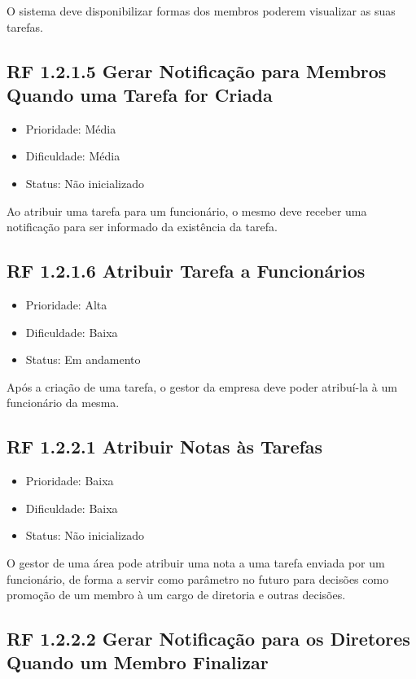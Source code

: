 O sistema deve disponibilizar formas dos membros poderem visualizar as suas tarefas.


\subsection{RF 1.2.1.5 Gerar Notificação para Membros Quando uma Tarefa for Criada}

\begin{itemize}
  \item{Prioridade: Média}
  \item{Dificuldade: Média}
  \item{Status: Não inicializado}
\end{itemize}

Ao atribuir uma tarefa para um funcionário, o mesmo deve receber uma notificação para ser informado da existência da tarefa.


\subsection{RF 1.2.1.6 Atribuir Tarefa a Funcionários}

\begin{itemize}
  \item{Prioridade: Alta}
  \item{Dificuldade: Baixa}
  \item{Status: Em andamento}
\end{itemize}

Após a criação de uma tarefa, o gestor da empresa deve poder atribuí-la à um funcionário da mesma.


\subsection{RF 1.2.2.1 Atribuir Notas às Tarefas}

\begin{itemize}
  \item{Prioridade: Baixa}
  \item{Dificuldade: Baixa}
  \item{Status: Não inicializado}
\end{itemize}

O gestor de uma área pode atribuir uma nota a uma tarefa enviada por um funcionário, de forma a servir como parâmetro no futuro para decisões como promoção de um membro à um cargo de diretoria e outras decisões.


\subsection{RF 1.2.2.2 Gerar Notificação para os Diretores Quando um Membro Finalizar}


